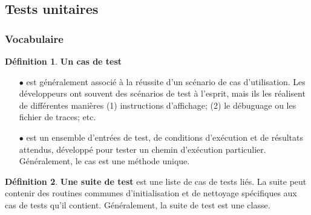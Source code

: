 \documentclass[a4paper,11pt,french]{report}
\theoremstyle{definition}
\newtheorem{definition}{Définition}[section]
\begin{document}
\subsection{Tests unitaires}

\subsubsection{Vocabulaire}
\theoremstyle{definition}
\begin{definition}{ \textbf{Un cas de test}}
\begin{itemize}
  \item [$\bullet$] est généralement associé à la réussite d'un scénario de cas d'utilisation. Les développeurs ont souvent des scénarios de test à l'esprit, mais ils les réalisent de différentes manières (1) instructions d'affichage; (2) le débuguage ou les fichier de traces; etc.

 \item [$\bullet$] est un ensemble d'entrées de test, de conditions d'exécution et de résultats attendus, développé pour tester un chemin d'exécution particulier. Généralement, le cas est une méthode unique.
 \end{itemize}
 \end{definition}

\begin{definition}{ \textbf{Une suite de test}}
 est une liste de cas de tests liés. La suite peut contenir des routines communes d'initialisation et de nettoyage spécifiques aux cas de tests qu'il contient. Généralement, la suite de test est une classe.
 \end{definition}
\end{document}
